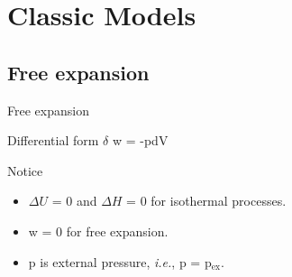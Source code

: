 \documentclass[12pt,compress]{beamer}
\begin{document}

\section{Classic Models}

\subsection{Free expansion}
\begin{frame}{Free expansion}
    \begin{block}{Differential form}
        $\delta$ w = -pdV
    \end{block}
    \begin{block}{Notice}
        \begin{itemize}
            \item $\Delta U$ = 0 and $\Delta H$ = 0 for isothermal processes.
            \item w = 0 for free expansion.
            \item p is external pressure, \textit{i.e.}, p = p$_\text{ex}$.
        \end{itemize}
    \end{block}
\end{frame}
\end{document}
